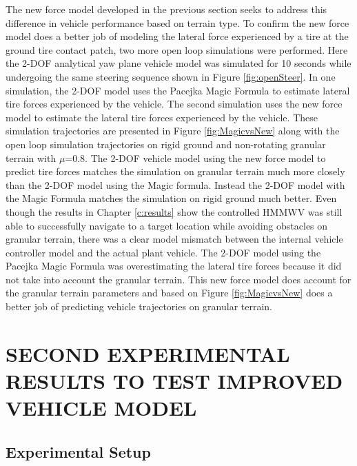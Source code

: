 \documentclass[12pt,onecolumn]{report}
\newcommand{\CHRONO}{{\sffamily{{Chrono}}}}
\begin{document}
The new force model developed in the previous section seeks to address this difference in vehicle performance based on terrain type. To confirm the new force model does a better job of modeling the lateral force experienced by a tire at the ground tire contact patch, two more open loop simulations were performed. Here the 2-DOF analytical yaw plane vehicle model was simulated for 10 seconds while undergoing the same steering sequence shown in Figure \ref{fig:openSteer}. In one simulation, the 2-DOF model uses the Pacejka Magic Formula to estimate lateral tire forces experienced by the vehicle. The second simulation uses the new force model to estimate the lateral tire forces experienced by the vehicle. These simulation trajectories are presented in Figure \ref{fig:MagicvsNew} along with the {\CHRONO} open loop simulation trajectories on rigid ground and non-rotating granular terrain with $\mu$=0.8. The 2-DOF vehicle model using the new force model to predict tire forces matches the {\CHRONO} simulation on granular terrain much more closely than the 2-DOF model using the Magic formula. Instead the 2-DOF model with the Magic Formula matches the {\CHRONO} simulation on rigid ground much better. Even though the results in Chapter \ref{c:results} show the controlled HMMWV was still able to successfully navigate to a target location while avoiding obstacles on granular terrain, there was a clear model mismatch between the internal vehicle controller model and the actual plant vehicle. The 2-DOF model using the Pacejka Magic Formula was overestimating the lateral tire forces because it did not take into account the granular terrain. This new force model does account for the granular terrain parameters and based on Figure \ref{fig:MagicvsNew} does a better job of predicting vehicle trajectories on granular terrain. 


\chapter{SECOND EXPERIMENTAL RESULTS TO TEST IMPROVED VEHICLE MODEL}\label{c:Exp2}

\section{Experimental Setup}\label{s:ExpSetup2}
\end{document}
